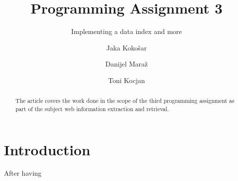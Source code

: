 \documentclass[runningheads]{llncs}
\begin{document}
\title{Programming Assignment 3}
\subtitle{Implementing a data index and more}

\author{
  Jaka Kokošar
  \and
  Danijel Maraž
  \and
  Toni Kocjan
}


\maketitle             

\begin{abstract}
The article covers the work done in the scope of the third programming assignment as part of the subject web information extraction and retrieval. 

\end{abstract}

\section{Introduction}
After having 
\end{document}
